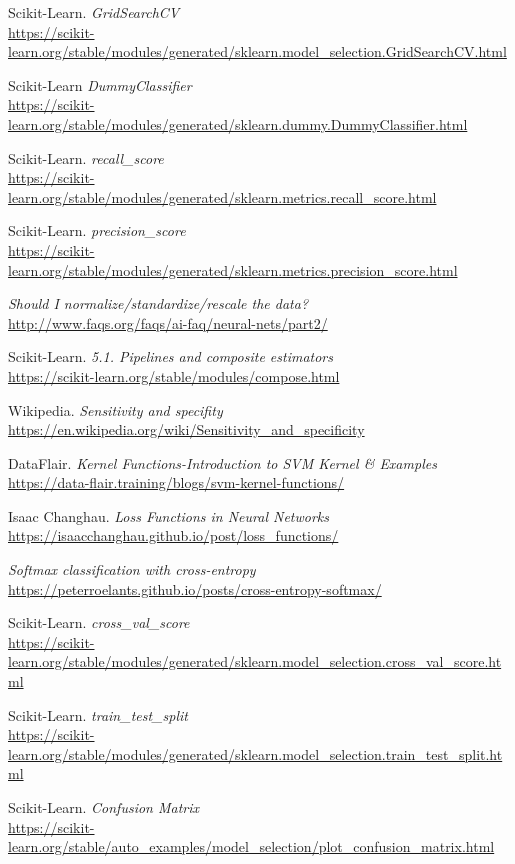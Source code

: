 \documentclass[11pt,a4paper]{article}
\begin{document}
\begin{thebibliography}{25}
Scikit-Learn. \textit{GridSearchCV}
\\\url{https://scikit-learn.org/stable/modules/generated/sklearn.model_selection.GridSearchCV.html}

Scikit-Learn \textit{DummyClassifier}
\\\url{https://scikit-learn.org/stable/modules/generated/sklearn.dummy.DummyClassifier.html}

Scikit-Learn. \textit{recall\_score}
\\\url{https://scikit-learn.org/stable/modules/generated/sklearn.metrics.recall_score.html}

Scikit-Learn. \textit{precision\_score}
\\\url{https://scikit-learn.org/stable/modules/generated/sklearn.metrics.precision_score.html}

\textit{Should I normalize/standardize/rescale the data?}
\\\url{http://www.faqs.org/faqs/ai-faq/neural-nets/part2/}

Scikit-Learn. \textit{5.1. Pipelines and composite estimators}
\\\url{https://scikit-learn.org/stable/modules/compose.html}

Wikipedia. \textit{Sensitivity and specifity}
\\\url{https://en.wikipedia.org/wiki/Sensitivity_and_specificity}

DataFlair. \textit{Kernel Functions-Introduction to SVM Kernel \& Examples}
\\\url{https://data-flair.training/blogs/svm-kernel-functions/}

Isaac Changhau. \textit{Loss Functions in Neural Networks}
\\\url{https://isaacchanghau.github.io/post/loss_functions/}

\textit{Softmax classification with cross-entropy}
\\\url{https://peterroelants.github.io/posts/cross-entropy-softmax/}

Scikit-Learn. \textit{cross\_val\_score}
\\\url{https://scikit-learn.org/stable/modules/generated/sklearn.model_selection.cross_val_score.html}

Scikit-Learn. \textit{train\_test\_split}
\\\url{https://scikit-learn.org/stable/modules/generated/sklearn.model_selection.train_test_split.html}

Scikit-Learn. \textit{Confusion Matrix}
\\\url{https://scikit-learn.org/stable/auto_examples/model_selection/plot_confusion_matrix.html}

\end{thebibliography}
\end{document}
